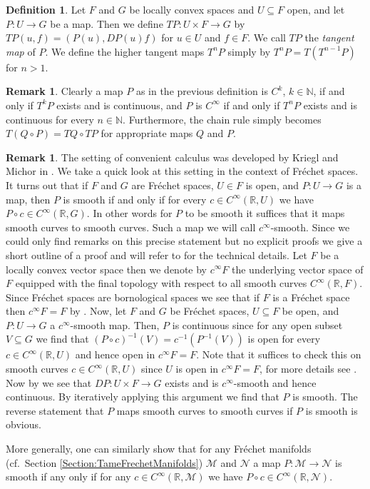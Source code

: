 \documentclass[12pt,a4paper]{article}
\theoremstyle{plain}
\theoremstyle{definition}
\newtheorem{definition}[theorem]{Definition}
\newtheorem{remark}[theorem]{Remark}
\newcommand{\R}{\mathbb{R}}
\newcommand{\N}{\mathbb{N}}
\newcommand{\Mcal}{\mathcal{M}}
\newcommand{\Ncal}{\mathcal{N}}
\begin{document}
\begin{definition}
Let $F$ and $G$ be locally convex spaces and $U\subseteq F$ open, and let $P:U\to G$ be a map. Then we define $TP:U\times F\to G$ by $TP(u,f)=(P(u),DP(u)f)$ for $u\in U$ and $f\in F$. We call $TP$ the \textit{tangent map} of $P$.
We define the higher tangent maps $T^nP$ simply by $T^nP=T(T^{n-1}P)$ for $n>1$.
\end{definition}

\begin{remark}
Clearly a map $P$ as in the previous definition is $C^k$, $k\in \N$, if and only if $T^kP$ exists and is continuous, and $P$ is $C^\infty$ if and only if $T^nP$ exists and is continuous for every $n\in \N$. Furthermore, the chain rule simply becomes $T(Q\circ P)=TQ\circ TP$ for appropriate maps $Q$ and $P$.
\end{remark}


\begin{remark}
\label{Rem:ConvenientCalculus}
The setting of convenient calculus was developed by Kriegl and Michor in \cite{ConvSetting}. We take a quick look at this setting in the context of Fréchet spaces.
It turns out that if $F$ and $G$ are Fréchet spaces, $U\in F$ is open, and $P:U\to G$ is a map, then $P$ is smooth if and only if for every $c\in C^\infty(\R,U)$ we have $P\circ c\in C^\infty(\R,G)$. In other words for $P$ to be smooth it suffices that it maps smooth curves to smooth curves. Such a map we will call $c^\infty$-smooth. 
Since we could only find remarks on this precise statement but no explicit proofs we give a short outline of a proof and will refer to \cite{ConvSetting} for the technical details.
Let $F$ be a locally convex vector space then we denote by $c^\infty F$ the underlying vector space of $F$ equipped with the final topology with respect to all smooth curves $C^\infty(\R,F)$. Since Fréchet spaces are bornological spaces we see that if $F$ is a Fréchet space then $c^\infty F=F$ by \cite[Theorem 4.11 (1)]{ConvSetting}. Now, let $F$ and $G$ be Fréchet spaces, $U\subseteq F$ be open, and $P:U\to G$ a $c^\infty$-smooth map. Then, $P$ is continuous since for any open subset $V\subseteq G$ we find that $(P\circ c)^{-1}(V)=c^{-1}(P^{-1}(V))$ is open for every $c\in C^\infty(\R,U)$ and hence open in $c^\infty F=F$. Note that it suffices to check this on smooth curves $c\in C^\infty(\R,U)$ since $U$ is open in $c^\infty F=F$, for more details see \cite[Lemma 24.6 (1)]{ConvSetting}.
Now by \cite[Theorem 3.12, Definition 3.17, and Theorem 3.18]{ConvSetting} we see that $DP:U\times F\to G$ exists and is $c^\infty$-smooth and hence continuous. By iteratively applying this argument we find that $P$ is smooth. The reverse statement that $P$ maps smooth curves to smooth curves if $P$ is smooth is obvious. 

More generally, one can similarly show that for any Fréchet manifolds (cf.~Section \ref{Section:TameFrechetManifolds}) $\Mcal$ and $\Ncal$ a map $P:\Mcal\to \Ncal$ is smooth if any only if for any $c\in C^\infty(\R,\Mcal)$ we have $P\circ c\in C^\infty(\R,\Ncal)$.
\end{remark}
\end{document}
